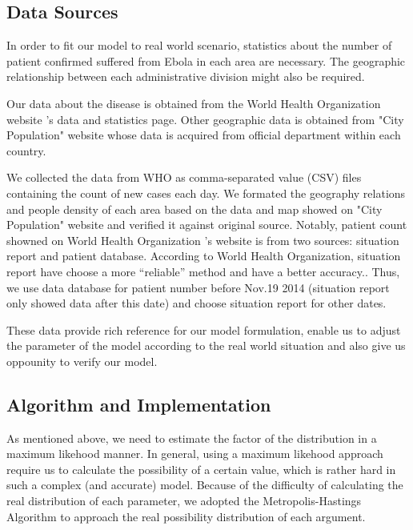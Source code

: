\documentclass[12pt]{article}
\begin{document}
\subsection{Data Sources}

In order to fit our model to real world scenario, statistics about the number of patient confirmed suffered from Ebola in each area are necessary. The geographic relationship between each administrative division might also be required.

Our data about the disease is obtained from the World Health Organization website 's data and statistics page. Other geographic data is obtained from "City Population" website\cite{citypop} whose data is acquired from official department within each country\cite{liberia,sierraleone,guinea}.

We collected the data from WHO as comma-separated value (CSV) files containing the count of new cases each day. We formated the geography relations and people density of each area based on the data and map showed on "City Population" website and verified it against original source. Notably, patient count showned on World Health Organization 's website is from two sources: situation report and patient database. According to World Health Organization, situation report have choose a more ``reliable'' method and have a better accuracy.\cite{whositrep}. Thus, we use data database for patient number before Nov.19 2014 (situation report only showed data after this date) and choose situation report for other dates. 

These data provide rich reference for our model formulation, enable us to adjust the parameter of the model according to the real world situation and also give us oppounity to verify our model.

\subsection{Algorithm and Implementation}

As mentioned above, we need to estimate the factor of the distribution in a maximum likehood manner. In general, using a maximum likehood approach require us to calculate  the possibility of a certain value, which is rather hard in such a complex (and accurate) model. Because of the difficulty of calculating the real distribution of each parameter, we adopted the Metropolis-Hastings Algorithm\cite{besag1993spatial} to approach the real possibility distribution of each argument.
\end{document}
